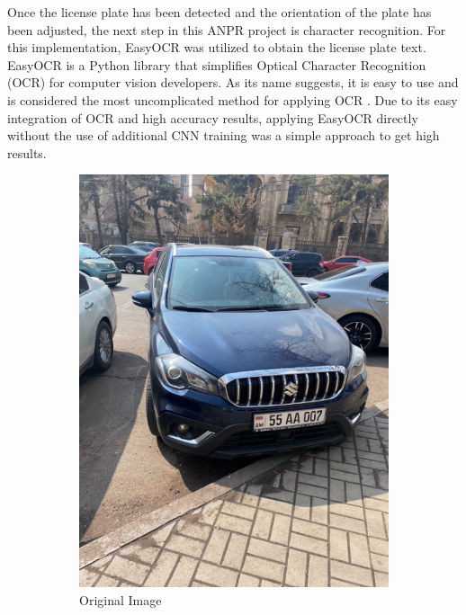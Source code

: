 \documentclass[conference]{IEEEtran}
\begin{document}
Once the license plate has been detected and the orientation of the plate has been adjusted, the next step in this ANPR project is character recognition. For this implementation, EasyOCR was utilized to obtain the license plate text. EasyOCR is a Python library that simplifies Optical Character Recognition (OCR) for computer vision developers. As its name suggests, it is easy to use and is considered the most uncomplicated method for applying OCR \cite{b20}.
Due to its easy integration of OCR and high accuracy results, applying EasyOCR directly without the use of additional CNN training was a simple approach to get high results.

\begin{figure}[ht]
  \centering
  \begin{subfigure}[b]{0.45\linewidth}
    \includegraphics[width=\linewidth]{images/Picture30.png}
    \caption{Original Image}
  \end{subfigure}
  \begin{subfigure}[b]{0.45\linewidth}

\end{subfigure}
\end{figure}
\end{document}
